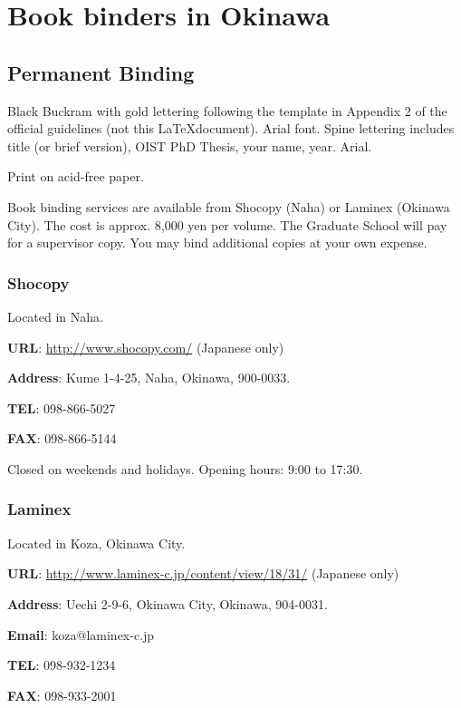 

\chapter{Book binders in Okinawa} \label{appA}

\section*{Permanent Binding}
Black Buckram with gold lettering following the template in Appendix 2 of the official guidelines (not this \LaTeX document). Arial font. Spine lettering includes title (or brief version), OIST PhD Thesis, your name, year. Arial.

Print on acid-free paper.

Book binding services are available from Shocopy (Naha) or Laminex (Okinawa City). The cost is approx.  8,000 yen per volume.  The Graduate School will pay for a supervisor copy. You may bind additional copies at your own expense.

\subsection*{Shocopy}

Located in Naha.

\textbf{URL}: \url{http://www.shocopy.com/}   (Japanese only)

\textbf{Address}: Kume 1-4-25, Naha, Okinawa, 900-0033.

\textbf{TEL}: 098-866-5027

\textbf{FAX}: 098-866-5144

Closed on weekends and holidays. Opening hours: 9:00 to 17:30.

\subsection*{Laminex}

Located in Koza, Okinawa City.

\textbf{URL}: \url{http://www.laminex-c.jp/content/view/18/31/} (Japanese only)

\textbf{Address}: Uechi 2-9-6, Okinawa City, Okinawa, 904-0031.

\textbf{Email}: koza@laminex-c.jp

\textbf{TEL}: 098-932-1234

\textbf{FAX}: 098-933-2001

